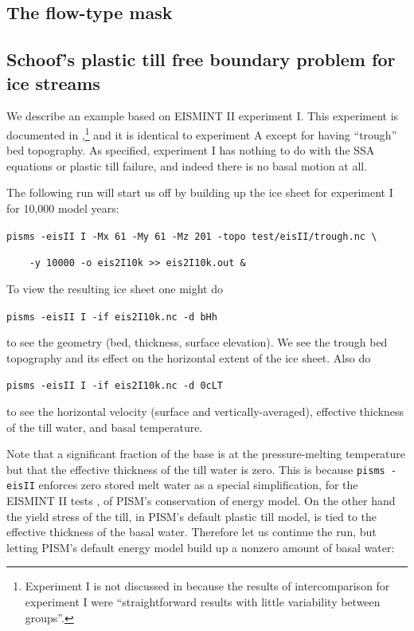 \documentclass[11pt,final]{amsart}
\begin{document}
\subsection{The flow-type mask} \label{subsect:mask}  

\subsection{Schoof's plastic till free boundary problem for ice streams}  We describe an example based on EISMINT II experiment I.  This experiment is documented in \cite{EISIIdescribe},\footnote{Experiment I is not discussed in \cite{EISMINT00} because the results of intercomparison for experiment I were ``straightforward results with little variability between groups''.} and it is identical to experiment A except for having ``trough'' bed topography.   As specified, experiment I has nothing to do with the SSA equations or plastic till failure, and indeed there is no basal motion at all.

The following run will start us off by building up the ice sheet for experiment I for 10,000 model years:

\verb|pisms -eisII I -Mx 61 -My 61 -Mz 201 -topo test/eisII/trough.nc \|

\verb|    -y 10000 -o eis2I10k >> eis2I10k.out &|

\noindent To view the resulting ice sheet one might do

\verb|pisms -eisII I -if eis2I10k.nc -d bHh|

\noindent to see the geometry (bed, thickness, surface elevation).  We see the trough bed topography and its effect on the horizontal extent of the ice sheet.  Also do

\verb|pisms -eisII I -if eis2I10k.nc -d 0cLT|

\noindent to see the horizontal velocity (surface and vertically-averaged), effective thickness of the till water, and basal temperature.

Note that a significant fraction of the base is at the pressure-melting temperature but that the effective thickness of the till water is zero.  This is because \verb|pisms -eisII| enforces zero stored melt water as a special simplification, for the EISMINT II tests \cite{EISMINT00}, of PISM's conservation of energy model.  On the other hand the yield stress of the till, in PISM's default plastic till model, is tied to the effective thickness of the basal water.  Therefore let us continue the run, but letting PISM's default energy model build up a nonzero amount of basal water:
\end{document}
